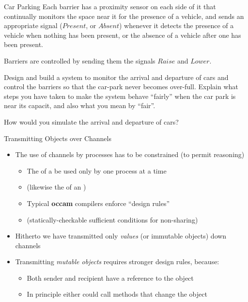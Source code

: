 \documentclass{concdistfoils}
\def\heading#1{\begin{cframed}[8.8in]{#1}\end{cframed}}
\begin{document}
\begin{slide}
\begin{itemize}
\begin{ex**}{Car Parking}
Each barrier has a proximity sensor on each side of it that
continually monitors the space near it for the presence of a
vehicle, and sends an appropriate signal ($Present$, or
$Absent$) whenever it detects the presence of a vehicle when
nothing has been present, or the absence of a vehicle after
one has been present.

Barriers are controlled by sending them the signals $Raise$ and $Lower$.

Design and build a system to monitor the arrival and departure
of cars and control the barriers so that the car-park
never becomes over-full. Explain what steps you have
taken to make the system behave ``fairly'' when the car park is
near its capacit, and also what you mean by ``fair''.

How would you simulate the arrival and departure of cars?
\end{ex**}
\end{itemize}
\end{slide}

\begin{slide}
\heading{Transmitting Objects over Channels}
\begin{itemize}
\item The use of channels by processes has to be constrained (to permit reasoning)
\begin{itemize}
\item The  of a  be used only by one process at a time
\item[] (likewise the  of an ) 
\item Typical \textbf{occam} compilers enforce ``design rules''
\item[] (statically-checkable sufficient conditions for non-sharing)
\end{itemize}
\vfill
\item Hitherto we have transmitted only \textit{values} (or immutable objects) down channels
\item Transmitting \textit{mutable objects} requires stronger design rules, because:
\begin{itemize}
\item Both sender and recipient have a reference to the object
\item In principle either could call methods that change the object
\end{itemize}
\end{itemize}
\end{slide}
\end{document}
